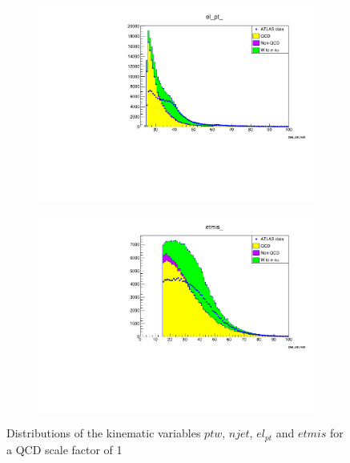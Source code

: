 \begin{figure}
\begin{subfigure}{0.5\textwidth}
        \includegraphics[width=\textwidth]{../W_mass/elpt_100_25_100_qcd1.pdf}
    \end{subfigure}
    \begin{subfigure}{0.5\textwidth}
        \includegraphics[width=\textwidth]{../W_mass/etmis_100_0_100_qcd1.pdf}
    \end{subfigure}
    \caption{Distributions of the kinematic variables $ptw$, $njet$, $el_{pt}$ and $etmis$ for a QCD scale factor of 1}
    \label{fig:qcd1}
\end{figure}

